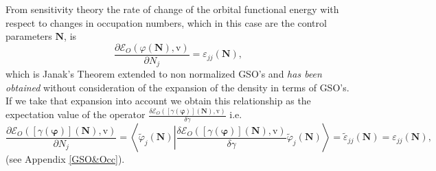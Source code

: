 \documentclass[aps,preprint]{revtex4}%
\begin{document}
From sensitivity theory the rate of change of the orbital functional energy
with respect to changes in occupation numbers, which in this case are the
control parameters $\mathbf{N}$, is
\begin{equation}
\frac{\partial\mathcal{E}_{O}\left(  \varphi\mathbf{\left(  \mathbf{N}\right)
},\mathrm{v}\right)  }{\partial N_{j}}=\varepsilon_{jj}\left(  \mathbf{N}%
\right)  , \label{Janak}%
\end{equation}
which is Janak's Theorem extended to non normalized GSO's and \emph{has been
obtained} without consideration of the expansion of the density in terms of
GSO's. If we take that expansion into account we obtain this relationship as
the expectation value of the operator $\frac{\delta\mathcal{E}_{O}\left(
\left[  \gamma\left(  \mathbf{\varphi}\right)  \right]  \mathbf{\left(
\mathbf{N}\right)  ,}\mathrm{v}\right)  }{\delta\gamma}$ i.e.
\begin{equation}
\frac{\partial\mathcal{E}_{O}\left(  \left[  \gamma\left(  \mathbf{\varphi
}\right)  \right]  \mathbf{\left(  \mathbf{N}\right)  },\mathrm{v}\right)
}{\partial N_{j}}=\left\langle \tilde{\varphi}_{j}\left(  \mathbf{N}\right)
\left\vert \frac{\delta\mathcal{E}_{O}\left(  \left[  \gamma\left(
\mathbf{\varphi}\right)  \right]  \mathbf{\left(  \mathbf{N}\right)
,}\mathrm{v}\right)  }{\delta\gamma}\right.  \tilde{\varphi}_{j}\left(
\mathbf{N}\right)  \right\rangle =\tilde{\varepsilon}_{jj}\left(
\mathbf{N}\right)  =\varepsilon_{jj}\left(  \mathbf{N}\right)  ,
\end{equation}
(see Appendix \ref{GSO&Occ}).
\end{document}
